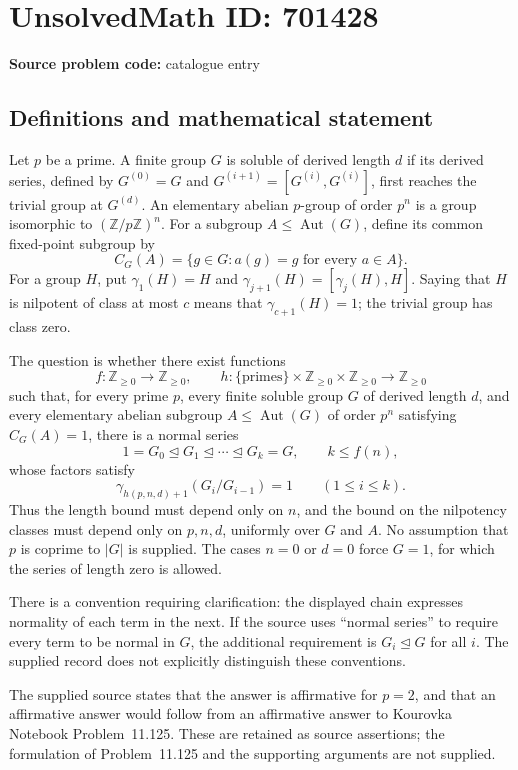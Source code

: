 \documentclass[11pt]{article}
\newcommand{\Z}{\mathbb{Z}}
\begin{document}
\section*{UnsolvedMath ID: 701428}
\textbf{Source problem code:} catalogue entry
\subsection{Definitions and mathematical statement}
Let \(p\) be a prime. A finite group \(G\) is soluble of derived length \(d\) if its derived series, defined by \(G^{(0)}=G\) and \(G^{(i+1)}=[G^{(i)},G^{(i)}]\), first reaches the trivial group at \(G^{(d)}\). An elementary abelian \(p\)-group of order \(p^n\) is a group isomorphic to \((\Z/p\Z)^n\). For a subgroup \(A\leq\operatorname{Aut}(G)\), define its common fixed-point subgroup by
\[
C_G(A)=\{g\in G: a(g)=g\text{ for every }a\in A\}.
\]
For a group \(H\), put \(\gamma_1(H)=H\) and \(\gamma_{j+1}(H)=[\gamma_j(H),H]\). Saying that \(H\) is nilpotent of class at most \(c\) means that \(\gamma_{c+1}(H)=1\); the trivial group has class zero.

The question is whether there exist functions
\[
f:\Z_{\geq0}\longrightarrow\Z_{\geq0},\qquad
h:\{\text{primes}\}\times\Z_{\geq0}\times\Z_{\geq0}\longrightarrow\Z_{\geq0}
\]
such that, for every prime \(p\), every finite soluble group \(G\) of derived length \(d\), and every elementary abelian subgroup \(A\leq\operatorname{Aut}(G)\) of order \(p^n\) satisfying \(C_G(A)=1\), there is a normal series
\[
1=G_0\trianglelefteq G_1\trianglelefteq\cdots\trianglelefteq G_k=G,
\qquad k\leq f(n),
\]
whose factors satisfy
\[
\gamma_{h(p,n,d)+1}(G_i/G_{i-1})=1
\qquad(1\leq i\leq k).
\]
Thus the length bound must depend only on \(n\), and the bound on the nilpotency classes must depend only on \(p,n,d\), uniformly over \(G\) and \(A\). No assumption that \(p\) is coprime to \(|G|\) is supplied. The cases \(n=0\) or \(d=0\) force \(G=1\), for which the series of length zero is allowed.

There is a convention requiring clarification: the displayed chain expresses normality of each term in the next. If the source uses ``normal series'' to require every term to be normal in \(G\), the additional requirement is \(G_i\trianglelefteq G\) for all \(i\). The supplied record does not explicitly distinguish these conventions.

The supplied source states that the answer is affirmative for \(p=2\), and that an affirmative answer would follow from an affirmative answer to Kourovka Notebook Problem~11.125. These are retained as source assertions; the formulation of Problem~11.125 and the supporting arguments are not supplied.
\end{document}
